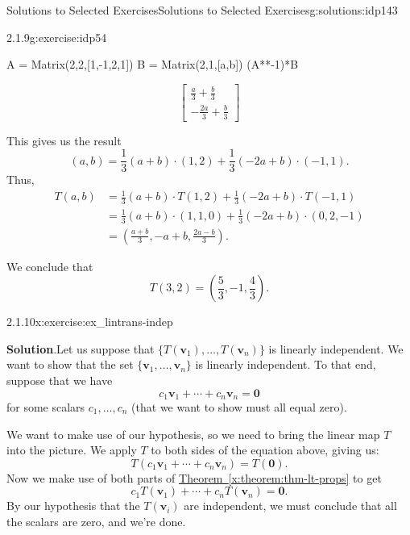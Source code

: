 \documentclass[oneside,10pt,]{book}
\newcommand{\blocktitlefont}{\relax}
\newcommand{\xreffont}{\relax}
\numberwithin{equation}{section}
\newcommand{\bbm}{\begin{bmatrix}}
\newcommand{\ebm}{\end{bmatrix}}
\newcommand{\vv}{\mathbf{v}}
\newcommand{\amp}{&}
\begin{document}
\begin{solutions-chapter}{Solutions to Selected Exercises}{}{Solutions to Selected Exercises}{}{}{g:solutions:idp143}
\begin{inlinesolution}{2.1.9}{}{g:exercise:idp54}
\begin{sageinput}
A = Matrix(2,2,[1,-1,2,1])
B = Matrix(2,1,[a,b])
(A**-1)*B
\end{sageinput}
\begin{sageoutput}
\[\bbm \frac{a}{3}+\frac{b}{3}\\-\frac{2a}{3}+\frac{b}{3}\ebm\]
\end{sageoutput}
This gives us the result%
\begin{equation*}
(a,b) = \frac13(a+b)\cdot (1,2)+\frac13(-2a+b)\cdot (-1,1).
\end{equation*}
Thus,%
\begin{align*}
T(a,b) \amp = \frac13(a+b)\cdot T(1,2)+\frac13(-2a+b)\cdot T(-1,1) \\
\amp = \frac13(a+b)\cdot (1,1,0)+\frac13(-2a+b)\cdot (0,2,-1)\\
\amp = \left(\frac{a+b}{3}, -a+b, \frac{2a-b}{3}\right)\text{.}
\end{align*}
%
\par
We conclude that%
\begin{equation*}
T(3,2) = \left(\frac53, -1, \frac43\right)\text{.}
\end{equation*}
%
\end{inlinesolution}%
\begin{inlinesolution}{2.1.10}{}{x:exercise:ex_lintrans-indep}%
\par\smallskip%
\noindent\textbf{\blocktitlefont Solution}.\hypertarget{g:solution:idp160-back}{}\quad{}Let us suppose that \(\{T(\vv_1),\ldots, T(\vv_n)\}\) is linearly independent. We want to show that the set \(\{\vv_1,\ldots, \vv_n\}\) is linearly independent. To that end, suppose that we have%
\begin{equation*}
c_1\vv_1+\cdots + c_n\vv_n=\mathbf{0}
\end{equation*}
for some scalars \(c_1,\ldots, c_n\) (that we want to show must all equal zero).%
\par
We want to make use of our hypothesis, so we need to bring the linear map \(T\) into the picture. We apply \(T\) to both sides of the equation above, giving us:%
\begin{equation*}
T(c_1\vv_1+\cdots + c_n\vv_n)=T(\mathbf{0})\text{.}
\end{equation*}
Now we make use of both parts of \hyperref[x:theorem:thm-lt-props]{Theorem~{\xreffont\ref{x:theorem:thm-lt-props}}} to get%
\begin{equation*}
c_1T(\vv_1)+\cdots +c_nT(\vv_n) = \mathbf{0}\text{.}
\end{equation*}
By our hypothesis that the \(T(\vv_i)\) are independent, we must conclude that all the scalars are zero, and we're done.%

\end{inlinesolution}
\end{solutions-chapter}
\end{document}
